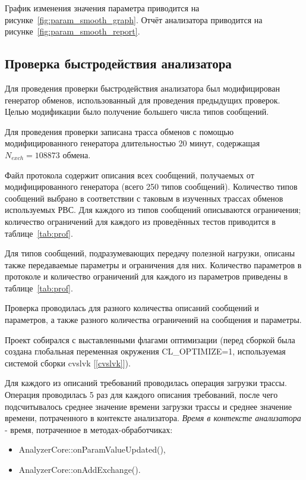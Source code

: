 График изменения значения параметра 
приводится на рисунке~\ref{fig:param_smooth_graph}. Отчёт анализатора 
приводится на рисунке~\ref{fig:param_smooth_report}.

\subsection{Проверка быстродействия анализатора}

Для проведения проверки быстродействия анализатора был модифицирован генератор 
обменов, использованный для проведения предыдущих проверок. Целью модификации 
было получение большего числа типов сообщений.

Для проведения проверки записана трасса обменов с помощью  
модифицированного генератора длительностью 20 минут, содержащая $N_{exch} 
= 108873$ обмена. 

Файл протокола содержит описания всех сообщений, получаемых от 
модифицированного генератора (всего 250 типов сообщений). Количество типов 
сообщений выбрано в соответствии с таковым в изученных трассах обменов 
используемых РВС. Для каждого из типов сообщений описываются ограничения; 
количество ограничений для каждого из проведённых тестов приводится в 
таблице~\ref{tab:prof}.

Для типов сообщений, подразумевающих передачу полезной нагрузки, описаны также 
передаваемые параметры и ограничения для них. Количество параметров в протоколе 
и количество ограничений для каждого из параметров приведены в 
таблице~\ref{tab:prof}.

Проверка проводилась для разного количества описаний сообщений и 
параметров, а также разного количества ограничений на сообщения и параметры.

Проект собирался с выставленными флагами оптимизации (перед сборкой была 
создана глобальная переменная окружения CL\_OPTIMIZE=1, используемая системой 
сборки cvslvk [\ref{cvslvk}]).

Для каждого из описаний требований проводилась операция загрузки трассы. 
Операция проводилась 5 раз для каждого описания требований, после чего 
подсчитывалось среднее значение времени загрузки трассы и среднее значение 
времени, потраченного в контексте анализатора. \textit{Время в контексте 
анализатора} - время, потраченное в методах-обработчиках:
\begin{itemize}
 \item AnalyzerCore::onParamValueUpdated(),
 \item AnalyzerCore::onAddExchange(). 
\end{itemize}

